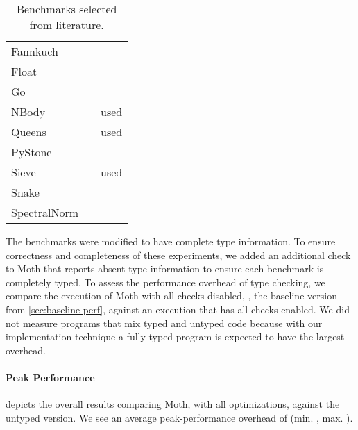 \begin{table}[htb]
  \caption{Benchmarks selected from literature.}
  \label{tab:gradual-benchmarks}
  \begin{center}
    \begin{tabular}{l l r}
      Fannkuch & \cite{Vitousek2017,Greenman2018} \\
      Float & \cite{Vitousek2017,Muehlboeck2017,Greenman2018} \\
      Go & \cite{Vitousek2017,Muehlboeck2017,Greenman2018} \\
      NBody & \cite{Kuhlenschmidt:2018:preprint,Vitousek2017,Greenman2018} & used \cite{Marr2016} \\
      Queens & \cite{Vitousek2017,Muehlboeck2017,Greenman2018} & used \cite{Marr2016} \\
      PyStone & \cite{Vitousek2017,Muehlboeck2017,Greenman2018} \\
      Sieve & \cite{Takikawa2016,Muehlboeck2017,Bauman2017,Richards2017} & used \cite{Marr2016} \\
      Snake & \cite{Takikawa2016,Muehlboeck2017,Bauman2017,Richards2017} \\
      SpectralNorm & \cite{Vitousek2017,Muehlboeck2017,Greenman2018} \\
    \end{tabular}
  \end{center}
\end{table}

The benchmarks were modified to have complete type information.
To ensure correctness and completeness of these experiments,
we added an additional check to Moth that
reports absent type information to ensure each benchmark is completely typed.
To assess the performance overhead of type checking,
we compare the execution of Moth with all checks disabled, \ie, the baseline version from
\cref{sec:baseline-perf}, against an execution that has all checks enabled.
We did not measure programs that mix typed and untyped code
because with our implementation technique a fully typed program is expected to
have the largest overhead.

\paragraph*{Peak Performance}

 depicts
the overall results comparing Moth,
with all optimizations,
against the untyped version.
We see an average peak-performance overhead of
\OverheadTypingGMeanP (min. \OverheadTypingMinP, max. \OverheadTypingMaxP).

